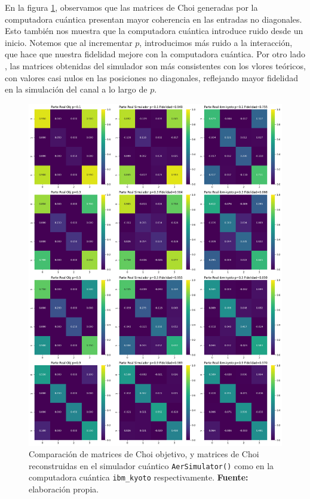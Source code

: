 \documentclass[letterpaper,12pt]{thesisECFM}
\theoremstyle{plain}
\theoremstyle{definition}
\theoremstyle{remark}
\newcommand{\1}{\mathbb{1}}
\begin{document}
En la figura \ref{fig:comparacion_choi}, observamos que las matrices de Choi generadas por la computadora cuántica presentan mayor coherencia en las entradas no diagonales. Esto también nos muestra que la computadora cuántica introduce ruido desde un inicio. Notemos que al incrementar $p$, introducimos más ruido a la interacción, que hace que nuestra fidelidad mejore con la computadora cuántica. Por otro lado , las matrices obtenidas del simulador son más consistentes con los vlores teóricos, con valores casi nulos en las posiciones no diagonales, reflejando mayor fidelidad en la simulación del canal a lo largo de $p$.

\begin{figure}[h!]
    \centering
    \includegraphics[width=0.95\linewidth]{imagenes/comparacion_choi.png}
    \caption{Comparación de matrices de Choi objetivo, y matrices de Choi reconstruidas en el simulador cuántico \texttt{AerSimulator()} como en la computadora cuántica \texttt{ibm\_kyoto} respectivamente. \textbf{Fuente:} elaboración propia.}
    \label{fig:comparacion_choi}
\end{figure}
\end{document}
